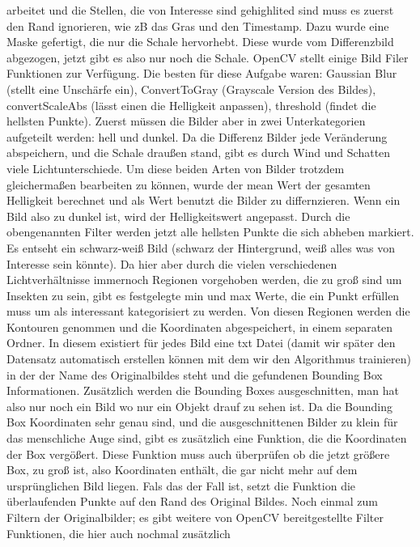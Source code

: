\documentclass[11pt]{scrartcl}
\begin{document}
\begin{enumerate}
    arbeitet und die Stellen, die von Interesse sind gehighlited sind muss es zuerst den Rand ignorieren, wie zB das Gras und den Timestamp.
    Dazu wurde eine Maske gefertigt, die nur die Schale hervorhebt. Diese wurde vom Differenzbild abgezogen, jetzt gibt es also nur noch die Schale.
    OpenCV stellt einige Bild Filer Funktionen zur Verfügung. Die besten für diese Aufgabe waren: Gaussian Blur (stellt eine Unschärfe ein),
    ConvertToGray (Grayscale Version des Bildes), convertScaleAbs (lässt einen die Helligkeit anpassen), threshold (findet die hellsten Punkte). Zuerst müssen die Bilder aber
    in zwei Unterkategorien aufgeteilt werden: hell und dunkel. Da die Differenz Bilder jede Veränderung abspeichern, und die Schale draußen stand,
    gibt es durch Wind und Schatten viele Lichtunterschiede. Um diese beiden Arten von Bilder trotzdem gleichermaßen bearbeiten zu können,
    wurde der mean Wert der gesamten Helligkeit berechnet und als Wert benutzt die Bilder zu differnzieren. Wenn ein Bild also zu dunkel ist, wird der
    Helligkeitswert angepasst. Durch die obengenannten Filter werden jetzt alle hellsten Punkte die sich abheben markiert.
    Es entseht ein schwarz-weiß Bild (schwarz der Hintergrund, weiß alles was von Interesse sein könnte). Da hier aber durch die vielen verschiedenen Lichtverhältnisse
    immernoch Regionen vorgehoben werden, die zu groß sind um Insekten zu sein, gibt es festgelegte min und max Werte, die ein Punkt erfüllen
    muss um als interessant kategorisiert zu werden. Von diesen Regionen werden die Kontouren genommen und die Koordinaten abgespeichert, in
    einem separaten Ordner. In diesem existiert für jedes Bild eine txt Datei (damit wir später den Datensatz automatisch erstellen können mit dem wir
    den Algorithmus trainieren) in der der Name des Originalbildes steht und die gefundenen Bounding Box Informationen. Zusätzlich 
    werden die Bounding Boxes ausgeschnitten, man hat also nur noch ein Bild wo nur ein Objekt drauf zu sehen ist. Da die Bounding Box
    Koordinaten sehr genau sind, und die ausgeschnittenen Bilder zu klein für das menschliche Auge sind, gibt es zusätzlich eine Funktion,
    die die Koordinaten der Box vergößert. Diese Funktion muss auch überprüfen ob die jetzt größere Box, zu groß ist, also Koordinaten
    enthält, die gar nicht mehr auf dem ursprünglichen Bild liegen. Fals das der Fall ist, setzt die Funktion die überlaufenden Punkte auf den Rand
    des Original Bildes.
    Noch einmal zum Filtern der Originalbilder; es gibt weitere von OpenCV bereitgestellte Filter Funktionen, die hier auch nochmal zusätzlich

\end{enumerate}
\end{document}
